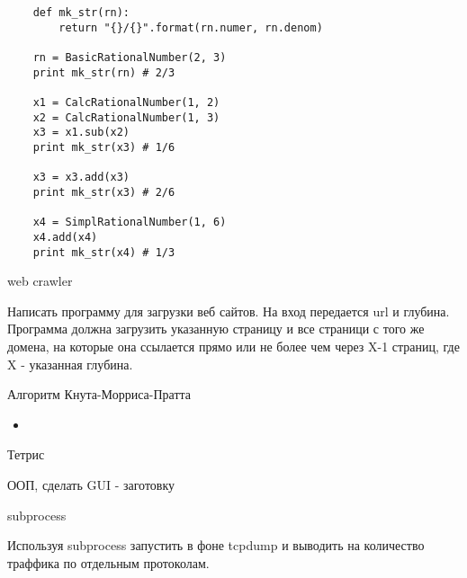 \documentclass{article}
\begin{document}
\begin{lstlisting}
    def mk_str(rn):
        return "{}/{}".format(rn.numer, rn.denom)

    rn = BasicRationalNumber(2, 3)
    print mk_str(rn) # 2/3

    x1 = CalcRationalNumber(1, 2)
    x2 = CalcRationalNumber(1, 3)
    x3 = x1.sub(x2)
    print mk_str(x3) # 1/6

    x3 = x3.add(x3)
    print mk_str(x3) # 2/6

    x4 = SimplRationalNumber(1, 6)
    x4.add(x4)
    print mk_str(x4) # 1/3
\end{lstlisting}

\newpage

\begin{center} web crawler \end{center}
Написать программу для загрузки веб сайтов. На вход передается url и глубина.
Программа должна загрузить указанную страницу и все страници с того же домена,
на которые она ссылается прямо или не более чем через X-1 страниц, где X - 
указанная глубина.
\newpage

\begin{center} Алгоритм Кнута-Морриса-Пратта \end{center}
\begin{itemize}
    \item 
\end{itemize}
\newpage

\begin{center} Тетрис \end{center}
ООП, сделать GUI - заготовку
\newpage

\begin{center} subprocess \end{center}
Используя subprocess запустить в фоне tcpdump и выводить на количество траффика
по отдельным протоколам.
\newpage

\end{document}

